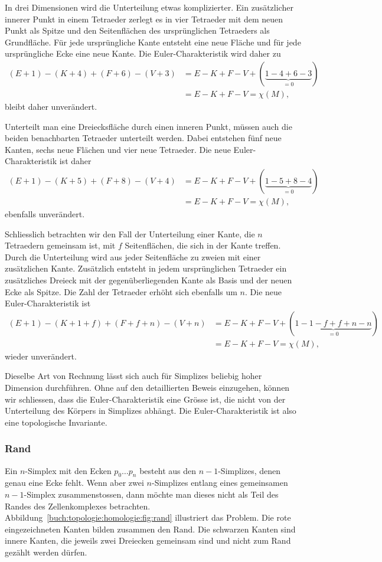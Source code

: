 In drei Dimensionen wird die Unterteilung etwas komplizierter.
Ein zusätzlicher innerer Punkt in einem Tetraeder zerlegt
es in vier Tetraeder mit dem neuen Punkt als Spitze und den
Seitenflächen des ursprünglichen Tetraeders als Grundfläche.
Für jede ursprüngliche Kante entsteht eine neue Fläche und
für jede ursprüngliche Ecke eine neue Kante.
Die Euler-Charakteristik wird daher zu
\begin{align*}
(E+1) - (K+4) + (F+6) - (V+3)
&=
E-K+F-V
+
(\underbrace{1-4+6-3}_{\displaystyle=0})
\\
&=
E-K+F-V
=
\chi(M),
\end{align*}
bleibt daher unverändert.

Unterteilt man eine Dreiecksfläche durch einen inneren Punkt,
müssen auch die beiden benachbarten Tetraeder unterteilt werden.
Dabei entstehen fünf neue Kanten, sechs neue Flächen und vier
neue Tetraeder.
Die neue Euler-Charakteristik ist daher
\begin{align*}
(E+1) - (K+5) + (F+8) - (V+4)
&=
E-K+F-V
+(\underbrace{1-5+8-4}_{\displaystyle=0})
\\
&=
E-K+F-V
=
\chi(M),
\end{align*}
ebenfalls unverändert.

Schliesslich betrachten wir den Fall der Unterteilung einer Kante,
die $n$ Tetraedern gemeinsam ist, mit $f$ Seitenflächen, die sich
in der Kante treffen.
Durch die Unterteilung wird aus jeder Seitenfläche zu zweien
mit einer zusätzlichen Kante.
Zusätzlich entsteht in jedem ursprünglichen Tetraeder ein zusätzliches
Dreieck mit der gegenüberliegenden Kante als Basis und der neuen
Ecke als Spitze.
Die Zahl der Tetraeder erhöht sich ebenfalls um $n$.
Die neue Euler-Charakteristik ist
\begin{align*}
(E+1)
-
(K+1+f)
+
(F+f+n)
-
(V+n)
&=
E-K+F-V + (\underbrace{1-1-f+f+n-n}_{\displaystyle=0})
\\
&=
E-K+F-V
=
\chi(M),
\end{align*}
wieder unverändert.

Dieselbe Art von Rechnung lässt sich auch für Simplizes beliebig hoher
Dimension durchführen.
Ohne auf den detaillierten Beweis einzugehen, können wir schliessen,
dass die Euler-Charakteristik eine Grösse ist, die nicht von der Unterteilung
des Körpers in Simplizes abhängt.
Die Euler-Charakteristik ist also eine topologische Invariante.

%
%
\subsubsection{Rand}
%
Ein $n$-Simplex mit den Ecken $p_0\dots p_n$ besteht aus den $n-1$-Simplizes,
denen genau eine Ecke fehlt.
Wenn aber zwei $n$-Simplizes entlang eines gemeinsamen $n-1$-Simplex
zusammenstossen, dann möchte man dieses nicht als Teil des Randes
des Zellenkomplexes betrachten.
Abbildung~\ref{buch:topologie:homologie:fig:rand} illustriert das Problem.
Die rote eingezeichneten Kanten bilden zusammen den Rand.
Die schwarzen Kanten sind innere Kanten, die jeweils zwei Dreiecken 
gemeinsam sind und nicht zum Rand gezählt werden dürfen.


